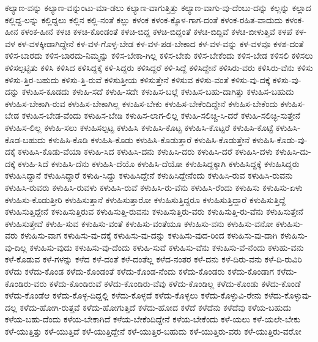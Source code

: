 {ಕಲ್ಯಾಣ-ವನ್ನು
ಕಲ್ಯಾಣ-ವನ್ನುಂಟು-ಮಾ-ಡಲು
ಕಲ್ಯಾಣ-ವಾಗುತ್ತಿತ್ತು
ಕಲ್ಯಾಣ-ವಾಗು-ವು-ದೆಂಬು-ದನ್ನು
ಕಲ್ಲನ್ನು
ಕಲ್ಲಾದ
ಕಲ್ಲಿದ್ದ-ಲನ್ನು
ಕಲ್ಲಿದ್ದಲು
ಕಲ್ಲಿನ
ಕಲ್ಲಿ-ನಂತೆ
ಕಲ್ಲು
ಕಳಂಕ
ಕಳಂಕ-ಕ್ಕೊಳ-ಗಾಗ-ದಂತೆ
ಕಳಂಕ-ರಹಿತ-ವಾದುದು
ಕಳಂಕ-ಹೀನ
ಕಳಂಕ-ಹೀನೆ
ಕಳಚಿ
ಕಳಚಿ-ಕೊಂಡಂತೆ
ಕಳಚಿ-ಬಿದ್ದ
ಕಳಚಿ-ಬಿದ್ದಂತೆ
ಕಳಚಿ-ಬಿದ್ದಿವೆ
ಕಳಚಿ-ಬೀಳುತ್ತಿವೆ
ಕಳಪೆ
ಕಳ-ವಳ
ಕಳ-ವಳಕ್ಕೀಡಾಗಿದ್ದೇನೆ
ಕಳ-ವಳ-ಗೊಳ್ಳ-ಬೇಡ
ಕಳ-ವಳ-ಪಡ-ಬೇಕಾದ
ಕಳ-ವಳ-ವನ್ನು
ಕಳ-ವಳವೂ
ಕಳಶ-ದಂತೆ
ಕಳಿಸ-ಬಾರದು
ಕಳಿಸ-ಬಾರದು-ನಿಮ್ಮನ್ನು
ಕಳಿಸ-ಬೇಕಾ-ಗಿಲ್ಲ
ಕಳಿಸ-ಬೇಕು
ಕಳಿಸ-ಬೇಕೆಂದು
ಕಳಿಸ-ಬೇಡ
ಕಳಿಸಲಿ
ಕಳಿಸಲು
ಕಳಿಸಲ್ಪಟ್ಟಿತು
ಕಳಿಸಿ
ಕಳಿಸಿದ
ಕಳಿಸಿದ್ದಕ್ಕೆ
ಕಳಿ-ಸಿದ್ದರು
ಕಳಿಸಿದ್ದರೆ
ಕಳಿ-ಸಿದ್ದೆ
ಕಳಿಸಿದ್ದೇನೆ
ಕಳಿಸಿರು-ವರು
ಕಳಿಸಿರು-ವೆನು
ಕಳಿಸು
ಕಳಿಸು-ತ್ತಿರ-ಬಹುದು
ಕಳಿಸು-ತ್ತಿ-ರುವೆ
ಕಳಿಸುತ್ತೀಯ
ಕಳಿಸುತ್ತೇನೆ
ಕಳಿಸುವ
ಕಳಿಸು-ವಂತೆ
ಕಳಿಸು-ವು-ದಕ್ಕೆ
ಕಳಿಸು-ವು-ದನ್ನು
ಕಳುಹಿಸ-ಕೂಡದು
ಕಳುಹಿ-ಸದೆ
ಕಳುಹಿ-ಸದೇ
ಕಳುಹಿಸ-ಬಲ್ಲೆ
ಕಳುಹಿಸ-ಬಹು-ದಾಗಿತ್ತು
ಕಳುಹಿಸ-ಬಹುದು
ಕಳುಹಿಸ-ಬೇಕಾಗಿ-ರುವ
ಕಳುಹಿಸ-ಬೇಕಾಗಿಲ್ಲ
ಕಳುಹಿಸ-ಬೇಕು
ಕಳುಹಿಸ-ಬೇಕೆಂದಿದ್ದೇನೆ
ಕಳುಹಿಸ-ಬೇಕೆಂದು
ಕಳುಹಿಸ-ಬೇಡ
ಕಳುಹಿಸ-ಬೇಡ-ವೆಂದು
ಕಳುಹಿಸ-ಬೇಡಿ
ಕಳುಹಿಸ-ಲಾಗ-ಲಿಲ್ಲ
ಕಳುಹಿ-ಸಲಿಚ್ಚಿ-ಸಿ-ದರೆ
ಕಳುಹಿ-ಸಲಿಚ್ಛಿ-ಸುತ್ತೇನೆ
ಕಳುಹಿಸ-ಲಿಲ್ಲ
ಕಳುಹಿ-ಸಲು
ಕಳುಹಿಸಲ್ಪಟ್ಟ
ಕಳುಹಿಸಿ
ಕಳುಹಿಸಿ-ಕೊಟ್ಟ
ಕಳುಹಿಸಿ-ಕೊಟ್ಟರೆ
ಕಳುಹಿಸಿ-ಕೊಟ್ಟೆ
ಕಳುಹಿಸಿ-ಕೊಡ-ಬಹುದು
ಕಳುಹಿಸಿ-ಕೊಡಿ
ಕಳುಹಿಸಿ-ಕೊಡು
ಕಳುಹಿಸಿ-ಕೊಡುತ್ತಾರೆ
ಕಳುಹಿಸಿ-ಕೊಡುತ್ತೇನೆ
ಕಳುಹಿಸಿ-ಕೊಡು-ವು-ದಕ್ಕೆ
ಕಳುಹಿಸಿ-ಕೊಡು-ವೆಯಾ
ಕಳುಹಿ-ಸಿದ
ಕಳುಹಿಸಿ-ದನು
ಕಳುಹಿಸಿ-ದರು
ಕಳುಹಿಸಿ-ದರೆ
ಕಳುಹಿಸಿ-ದಳು
ಕಳುಹಿಸಿ-ದು-ದಕ್ಕೆ
ಕಳುಹಿ-ಸಿದೆ
ಕಳುಹಿಸಿ-ದೆನು
ಕಳುಹಿಸಿ-ದೆಯೊ
ಕಳುಹಿಸಿ-ದೆಯೋ
ಕಳುಹಿಸಿದ್ದಕ್ಕಾಗಿ
ಕಳುಹಿಸಿದ್ದಕ್ಕೆ
ಕಳುಹಿಸಿದ್ದರು
ಕಳುಹಿಸಿದ್ದಾನೆ
ಕಳುಹಿಸಿದ್ದಾರೆ
ಕಳುಹಿ-ಸಿದ್ದು
ಕಳುಹಿಸಿದ್ದೇನೆ
ಕಳುಹಿಸಿದ್ದೇನೆಂದು
ಕಳುಹಿಸಿ-ರುವ
ಕಳುಹಿಸಿ-ರುವನು
ಕಳುಹಿಸಿ-ರುವರು
ಕಳುಹಿಸಿ-ರುವಳು
ಕಳುಹಿಸಿ-ರುವೆ
ಕಳುಹಿಸಿ-ರು-ವೆನು
ಕಳುಹಿಸಿ-ರೆಂದು
ಕಳುಹಿಸು
ಕಳುಹಿಸು-ಏಳು
ಕಳುಹಿಸು-ಕೊಡುತ್ತೀರಿ
ಕಳುಹಿಸುತ್ತಾನೆ
ಕಳುಹಿಸುತ್ತಾರೋ
ಕಳುಹಿಸುತ್ತಿದ್ದರೂ
ಕಳುಹಿಸುತ್ತಿದ್ದಾರೆ
ಕಳುಹಿಸುತ್ತಿದ್ದೆ
ಕಳುಹಿಸುತ್ತಿದ್ದೇನೆ
ಕಳುಹಿಸುತ್ತಿರುವ
ಕಳುಹಿಸುತ್ತಿ-ರುವನು
ಕಳುಹಿಸುತ್ತಿರು-ವರು
ಕಳುಹಿಸುತ್ತಿ-ರು-ವೆನು
ಕಳುಹಿಸುತ್ತೇನೆ
ಕಳುಹಿಸುತ್ತೇವೆ
ಕಳುಹಿ-ಸುವ
ಕಳುಹಿಸು-ವಂತೆ
ಕಳುಹಿಸು-ವಂತೆಯೂ
ಕಳುಹಿಸು-ವನು
ಕಳುಹಿಸು-ವನೋ
ಕಳುಹಿಸು-ವರು
ಕಳುಹಿಸು-ವಾಗ
ಕಳುಹಿಸು-ವು-ದಕ್ಕೆ
ಕಳುಹಿಸು-ವು-ದನ್ನು
ಕಳುಹಿಸು-ವುದ-ರಿಂದ
ಕಳುಹಿಸು-ವು-ದಾಗಿ
ಕಳುಹಿಸು-ವು-ದಿಲ್ಲ
ಕಳುಹಿಸು-ವುದು
ಕಳುಹಿಸು-ವು-ದೆಂದು
ಕಳುಹಿ-ಸುವೆ
ಕಳುಹಿಸು-ವೆನು
ಕಳುಹಿಸು-ವೆ-ನೆಂದು
ಕಳುಹು-ವನು
ಕಳೆ-ಕೊಡುವ
ಕಳೆ-ಗಳನ್ನು
ಕಳೆದ
ಕಳೆ-ದಂತೆ
ಕಳೆ-ದಂತೆಲ್ಲ
ಕಳೆದ-ನಂತರ
ಕಳೆ-ದನು
ಕಳೆ-ದಿರು-ವನು
ಕಳೆ-ದಿ-ರುವಿರಿ
ಕಳೆದು
ಕಳೆದು-ಕೊಂಡ
ಕಳೆದು-ಕೊಂಡಂತೆ
ಕಳೆದು-ಕೊಂಡ-ನೆಂದು
ಕಳೆದು-ಕೊಂಡರು
ಕಳೆದು-ಕೊಂಡಾಗ
ಕಳೆದು-ಕೊಂಡಿರು-ವರು
ಕಳೆದು-ಕೊಂಡಿರುವೆ
ಕಳೆದು-ಕೊಂಡಿರು-ವೆವು
ಕಳೆದು-ಕೊಂಡಿಲ್ಲ
ಕಳೆದು-ಕೊಂಡು
ಕಳೆದು-ಕೊಂಡೆ
ಕಳೆದು-ಕೊಂಡೆಆ
ಕಳೆದು-ಕೊಳ್ಳ-ದಿದ್ದಲ್ಲಿ
ಕಳೆದು-ಕೊಳ್ಳದೆ
ಕಳೆದು-ಕೊಳ್ಳಲು
ಕಳೆದು-ಕೊಳ್ಳುವಿ-ರೇನು
ಕಳೆದು-ಕೊಳ್ಳುವು-ದಲ್ಲ
ಕಳೆದು-ಹೋಗಿ-ರುತ್ತವೆ
ಕಳೆದು-ಹೋಗುತ್ತಿದೆ
ಕಳೆದು-ಹೋದ
ಕಳೆದೆ
ಕಳೆದೆನು
ಕಳೆದೆವು
ಕಳೆಯ-ಬಹುದು
ಕಳೆಯ-ಬಹು-ದೆಂದು
ಕಳೆಯ-ಬೇಕಾಗಿದೆ
ಕಳೆಯ-ಬೇಕೆಂದಿದ್ದೇನೆ
ಕಳೆಯ-ಬೇಕೆಂದು
ಕಳೆ-ಯಲು
ಕಳೆ-ಯಲೇ-ಬೇಕು
ಕಳೆ-ಯುತ್ತಿತ್ತು
ಕಳೆ-ಯುತ್ತಿದೆ
ಕಳೆ-ಯುತ್ತಿದ್ದೇನೆ
ಕಳೆ-ಯುತ್ತಿರ-ಬಹುದು
ಕಳೆ-ಯುತ್ತಿರು-ವರು
ಕಳೆ-ಯುತ್ತಿರು-ವರೋ
}
